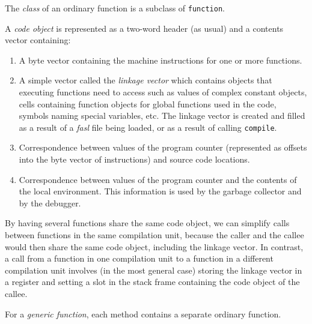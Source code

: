 The \emph{class} of an ordinary function is a subclass of
\texttt{function}. 

A \emph{code object} is represented as a two-word header (as usual)
and a contents vector containing:

\begin{enumerate}
\item A byte vector containing the machine instructions for one or
  more functions.
\item A simple vector called the \emph{linkage vector} which contains
  objects that executing functions need to access such as values of
  complex constant objects, cells containing function objects
  for global functions used in the code, symbols naming special
  variables, etc.  The linkage vector is created and filled as a
  result of a \emph{fasl} file being loaded, or as a result of calling
  \texttt{compile}. 
\item Correspondence between values of the program counter
  (represented as offsets into the byte vector of instructions) and
  source code locations.  
\item Correspondence between values of the program counter and the
  contents of the local environment.  This information is used by the
  garbage collector and by the debugger. 
\end{enumerate}

By having several functions share the same code object, we can
simplify calls between functions in the same compilation unit, because
the caller and the callee would then share the same code object,
including the linkage vector.  In contrast, a call from a function in
one compilation unit to a function in a different compilation unit
involves (in the most general case) storing the linkage vector in a
register and setting a slot in the stack frame containing the code
object of the callee. 

For a \emph{generic function}, each method contains a separate
ordinary function.  
